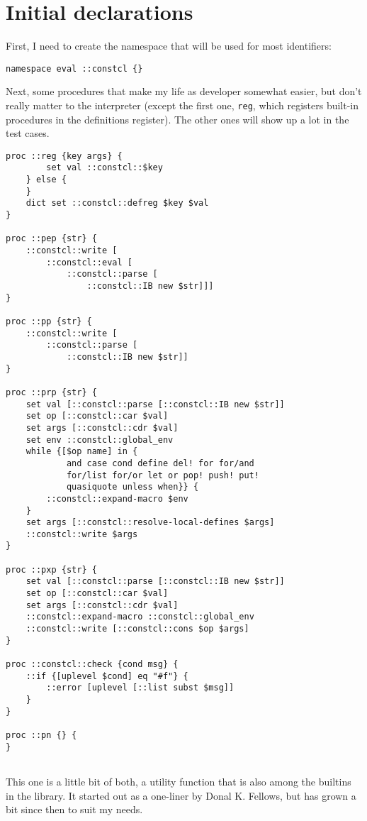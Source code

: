\documentclass{report}
\begin{document}
\section{Initial declarations}
\label{initial-declarations}

First, I need to create the namespace that will be used for most identifiers:

\noindent\makebox[\linewidth]{\rule{\linewidth}{0.4pt}}
\begin{lstlisting}
namespace eval ::constcl {}
\end{lstlisting}
\noindent\makebox[\linewidth]{\rule{\linewidth}{0.4pt}}

Next, some procedures that make my life as developer somewhat easier, but don't really matter to the interpreter (except the first one, \texttt{reg}, which registers built-in procedures in the definitions register). The other ones will show up a lot in the test cases.

\noindent\makebox[\linewidth]{\rule{\linewidth}{0.4pt}}
\begin{lstlisting}
proc ::reg {key args} {
        set val ::constcl::$key
    } else {
    }
    dict set ::constcl::defreg $key $val
}
 
proc ::pep {str} {
    ::constcl::write [
        ::constcl::eval [
            ::constcl::parse [
                ::constcl::IB new $str]]]
}
 
proc ::pp {str} {
    ::constcl::write [
        ::constcl::parse [
            ::constcl::IB new $str]]
}
 
proc ::prp {str} {
    set val [::constcl::parse [::constcl::IB new $str]]
    set op [::constcl::car $val]
    set args [::constcl::cdr $val]
    set env ::constcl::global_env
    while {[$op name] in {
            and case cond define del! for for/and
            for/list for/or let or pop! push! put!
            quasiquote unless when}} {
        ::constcl::expand-macro $env
    }
    set args [::constcl::resolve-local-defines $args]
    ::constcl::write $args
}
 
proc ::pxp {str} {
    set val [::constcl::parse [::constcl::IB new $str]]
    set op [::constcl::car $val]
    set args [::constcl::cdr $val]
    ::constcl::expand-macro ::constcl::global_env
    ::constcl::write [::constcl::cons $op $args]
}
 
proc ::constcl::check {cond msg} {
    ::if {[uplevel $cond] eq "#f"} {
        ::error [uplevel [::list subst $msg]]
    }
}
 
proc ::pn {} {
}
 
\end{lstlisting}
\noindent\makebox[\linewidth]{\rule{\linewidth}{0.4pt}}

This one is a little bit of both, a utility function that is also among the builtins in the library. It started out as a one-liner by Donal K. Fellows, but has grown a bit since then to suit my needs.
\end{document}
